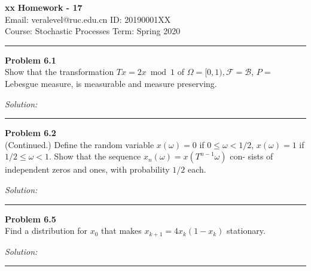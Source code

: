\documentclass[a4paper, 11pt]{article}
\newenvironment{problem}[2][Problem]
    { \begin{mdframed}[backgroundcolor=gray!20] \textbf{#1 #2} \\}
    {  \end{mdframed}}
\newenvironment{solution}
    {\textit{Solution:}}
    {}
\begin{document}
\noindent
\large\textbf{xx} \hfill \textbf{Homework - 17}   \\
Email: veralevel@ruc.edu.cn \hfill ID: 20190001XX \\
\normalsize Course: Stochastic Processes \hfill Term: Spring 2020\\
\noindent\rule{7in}{2.8pt}
\begin{problem}{6.1}
 Show that the transformation $T x=2 x \bmod 1$ of $\Omega=[0,1), \mathcal{F}=\mathcal{B}$,
$P=$ Lebesgue measure, is measurable and measure preserving.

\end{problem}
\begin{solution}

\end{solution} 
\noindent\rule{7in}{2.8pt}


\begin{problem}{6.2}
(Continued.) Define the random variable $x(\omega)=0$ if $0 \leq \omega<1 / 2$,
$x(\omega)=1$ if $1 / 2 \leq \omega<1$. Show that the sequence $x_{n}(\omega)=x\left(T^{n-1} \omega\right)$ con-
sists of independent zeros and ones, with probability $1 / 2$ each.
\end{problem}
\begin{solution}


\end{solution} 
%
\noindent\rule{7in}{2.8pt}

\begin{problem}{6.5}
Find a distribution for $x_0$ that makes $x_{k+1}= 4x_k(1-x_k)$ stationary.
\end{problem}
\begin{solution}


\end{solution} 
%
\noindent\rule{7in}{2.8pt}
\end{document}
